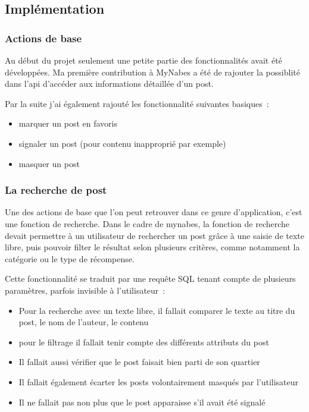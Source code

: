 \documentclass[rapport.tex]{subfiles}
\begin{document}
        \subsection{Implémentation}

        \subsubsection{Actions de base}
        Au début du projet seulement une petite partie des fonctionnalités avait été développées.
        Ma première contribution à MyNabes a été de rajouter la possiblité dans l'\gls{api} d'accéder
        aux informations détaillée d'un post. 
        
        Par la suite j'ai également rajouté les fonctionnalité suivantes basiques~:~
        \begin{itemize}
            \item marquer un post en favoris
            \item signaler un post (pour contenu inapproprié par exemple)
            \item masquer un post
        \end{itemize}

        \subsubsection{La recherche de post}
        Une des actions de base que l'on peut retrouver dans ce genre d'application, c'est une fonction de recherche.
        Dans le cadre de mynabes, la fonction de recherche devait permettre à un utilisateur de rechercher un post grâce
        à une saisie de texte libre, puis pouvoir filter le résultat selon plusieurs critères, comme notamment la catégorie
        ou le type de récompense.

        Cette fonctionnalité se traduit par une requête SQL tenant compte de plusieurs paramètres, parfois invisible à l'utilisateur~:~
        \begin{itemize}
            \item Pour la recherche avec un texte libre, il fallait comparer le texte au titre du post, le nom de l'auteur, le contenu
            \item pour le filtrage il fallait tenir compte des différents attributs du post
            \item Il fallait aussi vérifier que le post faisait bien parti de son quartier
            \item Il fallait également écarter les posts volontairement masqués par l'utilisateur
            \item Il ne fallait pas non plus que le post apparaisse s'il avait été signalé
        \end{itemize}
\end{document}
